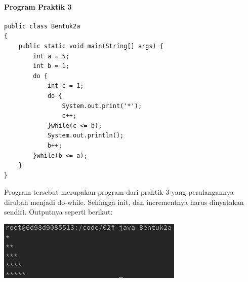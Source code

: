 \documentclass[a4paper,12pt]{article}
\begin{document}
\paragraph{Program Praktik 3}
\begin{center}
   \begin{lstlisting}
public class Bentuk2a
{
    public static void main(String[] args) {
        int a = 5;
        int b = 1;
        do {
            int c = 1;
            do {
                System.out.print('*');
                c++;
            }while(c <= b);
            System.out.println();
            b++;
        }while(b <= a);
    }
}
   \end{lstlisting} 
\end{center}
Program tersebut merupakan program dari praktik 3 yang perulangannya dirubah menjadi do-while. Sehingga init, dan incrementnya harus dinyatakan sendiri.
Outputnya seperti berikut:\\
\begin{center}
    \includegraphics[scale=.7]{9.png}
\end{center}
\end{document}
